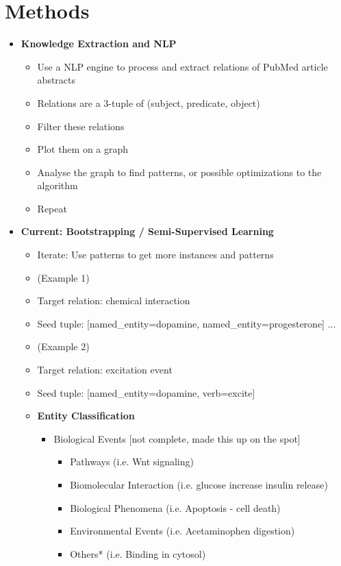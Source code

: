 \documentclass[11pt]{article}
\begin{document}
\section{Methods}

\begin{itemize}
\item \textbf{Knowledge Extraction and NLP}
	\begin{itemize}
	\item Use a NLP engine to process and extract relations of PubMed article abstracts
	\item Relations are a 3-tuple of (subject, predicate, object)
	\item Filter these relations
	\item Plot them on a graph
	\item Analyse the graph to find patterns, or possible optimizations to the algorithm
	\item Repeat
	\end{itemize}
\item \textbf{Current: Bootstrapping / Semi-Supervised Learning}
	\begin{itemize}
	\item Iterate: Use patterns to get more instances and patterns 
	\item (Example 1)	
	\item 		Target relation: chemical interaction
	\item 		Seed tuple: [named_entity=dopamine, named_entity=progesterone] ...
	\item (Example 2)	
	\item 		Target relation: excitation event
	\item 		Seed tuple: [named_entity=dopamine, verb=excite]	
\item \textbf{Entity Classification}
	\begin{itemize}
	\item Biological Events [not complete, made this up on the spot]
		\begin{itemize}
		\item Pathways (i.e. Wnt signaling)
		\item Biomolecular Interaction (i.e. glucose increase insulin release)
		\item Biological Phenomena (i.e. Apoptosis - cell death)
		\item Environmental Events (i.e. Acetaminophen digestion)
		\item Others* (i.e. Binding in cytosol)
		\end{itemize}
	\end{itemize}
\end{itemize}


\end{itemize}
\end{document}
